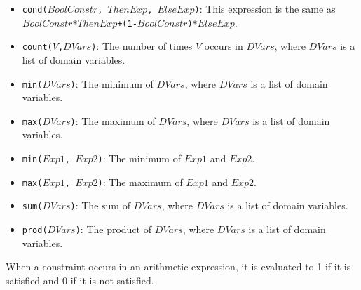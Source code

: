 \begin{itemize}
\item \texttt{cond($BoolConstr$, $ThenExp$, $ElseExp$)}: This expression is the same as\\ \texttt{$BoolConstr$*$ThenExp$+(1-$BoolConstr$)*$ElseExp$}.
\item \texttt{count($V$,$DVars$)}: The number of times $V$ occurs in $DVars$, where $DVars$ is a list of domain variables.
\item \texttt{min($DVars$)}: The minimum of $DVars$, where $DVars$ is a list of domain variables.
\item \texttt{max($DVars$)}: The maximum of $DVars$, where $DVars$ is a list of domain variables.
\item \texttt{min($Exp1$, $Exp2$)}: The minimum of $Exp1$ and $Exp2$.
\item \texttt{max($Exp1$, $Exp2$)}: The maximum of $Exp1$ and $Exp2$.
\item \texttt{sum($DVars$)}: The sum of $DVars$, where $DVars$ is a list of domain variables.
\item \texttt{prod($DVars$)}: The product of $DVars$, where $DVars$ is a list of domain variables.
\end{itemize}
When a constraint occurs in an arithmetic expression, it is evaluated to 1 if it is satisfied and 0 if it is not satisfied.

